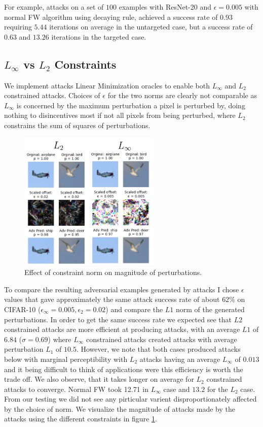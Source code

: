 \documentclass{article}
\begin{document}
For example, attacks on a set of $100$ examples with ResNet-20 and $\epsilon = 0.005$ with normal FW algorithm using decaying rule, achieved a success rate of $0.93$ requiring $5.44$ iterations on average in the untargeted case, but a success rate of $0.63$ and $13.26$ iterations in the targeted case.

\subsection{$L_\infty$ vs $L_2$ Constraints}
We implement attacks Linear Minimization oracles to enable both $L_\infty$ and $L_2$ constrained attacks. 
Choices of $\epsilon$ for the two norms are clearly not comparable as $L_\infty$ is concerned by the maximum perturbation a pixel is perturbed by, doing nothing to disincentives most if not all pixels from being perturbed, where $L_2$ constrains the sum of squares of perturbations. 

\begin{figure}[H]
    \centering
    \includegraphics[width=0.6\textwidth]{plots/norm.png}
    \caption{Effect of constraint norm on magnitude of perturbations.}
    \label{fig:norm}
\end{figure}

To compare the resulting adversarial examples generated by attacks I chose $\epsilon$ values that gave approximately the same attack success rate of about $62\%$ on CIFAR-10 ($\epsilon_\infty = 0.005, \epsilon_2 = 0.02$) and compare the $L1$ norm of the generated perturbations. In order to get the same success rate we expected see that $L2$ constrained attacks are more efficient at producing attacks, with an average $L1$ of $6.84$ ($\sigma = 0.69$) where $L_\infty$ constrained attacks created attacks with average perturbation $L_1$ of $10.5$. However, we note that both cases produced attacks below with marginal perceptibility with $L_2$ attacks having an average $L_\infty$ of $0.013$ and it being difficult to think of applications were this efficiency is worth the trade off.  We also observe, that it takes longer on average for $L_2$ constrained attacks to converge. Normal FW took 12.71 in $L_\infty$ case and $13.2$ for the $L_2$ case. From our testing we did not see any pirticular varient disproportionately affected by the choice of norm.
We visualize the magnitude of attacks made by the attacks using the different constraints in figure \ref{fig:norm}. 
\end{document}

